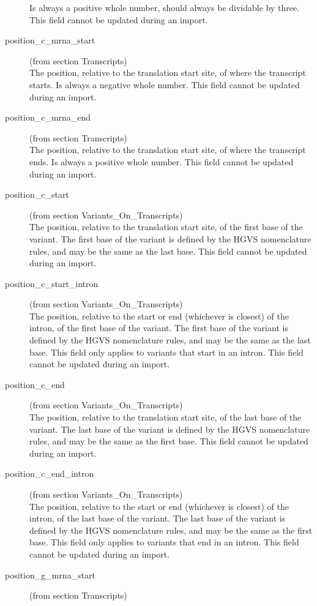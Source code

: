 \begin{description}
  Is always a positive whole number, should always be dividable by three.
  This field cannot be updated during an import.
  \item[position\_c\_mrna\_start] (from section Transcripts)\hfill \\
  The position, relative to the translation start site, of where the transcript starts.
  Is always a negative whole number.
  This field cannot be updated during an import.
  \item[position\_c\_mrna\_end] (from section Transcripts)\hfill \\
  The position, relative to the translation start site, of where the transcript ends.
  Is always a positive whole number.
  This field cannot be updated during an import.
  \item[position\_c\_start] (from section Variants\_On\_Transcripts)\hfill \\
  The position, relative to the translation start site, of the first base of the variant.
  The first base of the variant is defined by the HGVS nomenclature rules, and may be the same as the last base.
  This field cannot be updated during an import.
  \item[position\_c\_start\_intron] (from section Variants\_On\_Transcripts)\hfill \\
  The position, relative to the start or end (whichever is closest) of the intron, of the first base of the variant.
  The first base of the variant is defined by the HGVS nomenclature rules, and may be the same as the last base.
  This field only applies to variants that start in an intron.
  This field cannot be updated during an import.
  \item[position\_c\_end] (from section Variants\_On\_Transcripts)\hfill \\
  The position, relative to the translation start site, of the last base of the variant.
  The last base of the variant is defined by the HGVS nomenclature rules, and may be the same as the first base.
  This field cannot be updated during an import.
  \item[position\_c\_end\_intron] (from section Variants\_On\_Transcripts)\hfill \\
  The position, relative to the start or end (whichever is closest) of the intron, of the last base of the variant.
  The last base of the variant is defined by the HGVS nomenclature rules, and may be the same as the first base.
  This field only applies to variants that end in an intron.
  This field cannot be updated during an import.
  \item[position\_g\_mrna\_start] (from section Transcripts)\hfill \\

\end{description}
